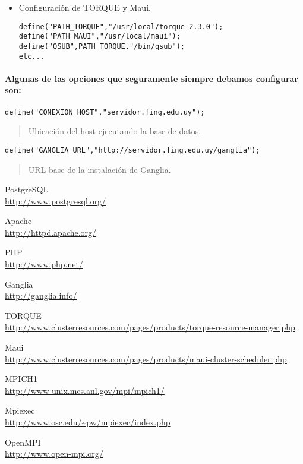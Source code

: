 \documentclass[a4paper,10pt,spanish]{article}
\begin{document}
\begin{itemize}
\item Configuraci\'{o}n de TORQUE y Maui.
\begin{verbatim}
define("PATH_TORQUE","/usr/local/torque-2.3.0");
define("PATH_MAUI","/usr/local/maui");
define("QSUB",PATH_TORQUE."/bin/qsub");
etc...
\end{verbatim}

\end{itemize}

\paragraph{Algunas de las opciones que seguramente siempre debamos configurar son:}
\begin{verbatim}
define("CONEXION_HOST","servidor.fing.edu.uy");
\end{verbatim}
\begin{quote}
Ubicaci\'{o}n del host ejecutando la base de datos.
\end{quote}
\begin{verbatim}
define("GANGLIA_URL","http://servidor.fing.edu.uy/ganglia");
\end{verbatim}
\begin{quote}
URL base de la instalaci\'{o}n de Ganglia.
\end{quote}

\begin{thebibliography}{99}
PostgreSQL\\\url{http://www.postgresql.org/}

Apache\\\url{http://httpd.apache.org/}

PHP\\\url{http://www.php.net/}

Ganglia\\\url{http://ganglia.info/}

TORQUE\\\url{http://www.clusterresources.com/pages/products/torque-resource-manager.php}

Maui\\\url{http://www.clusterresources.com/pages/products/maui-cluster-scheduler.php}

MPICH1\\\url{http://www-unix.mcs.anl.gov/mpi/mpich1/}

Mpiexec\\\url{http://www.osc.edu/~pw/mpiexec/index.php}

OpenMPI\\\url{http://www.open-mpi.org/}

\end{thebibliography}
\end{document}
